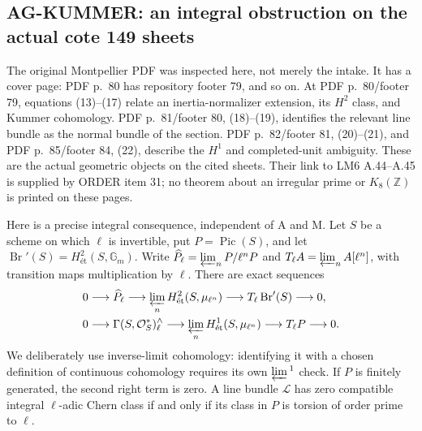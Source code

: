 \subsection{AG-KUMMER: an integral obstruction on the actual cote 149 sheets}
\label{ag:kummer}

The original Montpellier PDF was inspected here, not merely the intake.
It has a cover page: PDF p.~80 has repository footer 79, and so on.
At PDF p.~80/footer 79, equations (13)--(17) relate an inertia-normalizer
extension, its $H^2$ class, and Kummer cohomology. PDF p.~81/footer 80,
(18)--(19), identifies the relevant line bundle as the normal bundle of
the section. PDF p.~82/footer 81, (20)--(21), and PDF p.~85/footer 84,
(22), describe the $H^1$ and completed-unit ambiguity. These are the
actual geometric objects on the cited sheets. Their link to LM6
A.44--A.45 is supplied by ORDER item 31; no theorem about an irregular
prime or $K_8(\mathbb Z)$ is printed on these pages.

Here is a precise integral consequence, independent of A and M. Let $S$
be a scheme on which $\ell$ is invertible, put $P=\operatorname{Pic}(S)$,
and let $\operatorname{Br}'(S)=H^2_{\text{ét}}(S,\mathbb G_m)$.
Write $\widehat P_\ell=\varprojlim_nP/\ell^nP$ and
$T_\ell A=\varprojlim_n A[\ell^n]$, with transition maps multiplication
by $\ell$. There are exact sequences
\begin{align*}
 0&\longrightarrow\widehat P_\ell
   \longrightarrow\varprojlim_nH^2_{\text{ét}}(S,\mu_{\ell^n})
   \longrightarrow T_\ell\operatorname{Br}'(S)\longrightarrow0,\\
 0&\longrightarrow\Gamma(S,\mathcal O_S^*)^{\wedge}_\ell
   \longrightarrow\varprojlim_nH^1_{\text{ét}}(S,\mu_{\ell^n})
   \longrightarrow T_\ell P\longrightarrow0.
\end{align*}
We deliberately use inverse-limit cohomology: identifying it with a
chosen definition of continuous cohomology requires its own
$\varprojlim{}^1$ check. If $P$ is finitely generated, the second right
term is zero. A line bundle $\mathcal L$ has zero compatible integral
$\ell$-adic Chern class if and only if its class in $P$ is torsion of
order prime to $\ell$.

